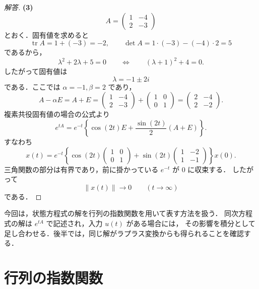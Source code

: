 \documentclass[article,paper=a4paper]{jlreq}
\begin{document}
\begin{proof}[解答]
\medskip
\textbf{(3)}
\[
  A=
  \begin{pmatrix}
    1 & -4\\
    2 & -3
  \end{pmatrix}
\]
とおく．固有値を求めると
\[
  \operatorname{tr}A=1+(-3)=-2,
  \qquad
  \det A=1\cdot(-3)-(-4)\cdot2=5
\]
であるから，
\[
  \lambda^2+2\lambda+5=0
  \qquad\Longleftrightarrow\qquad
  (\lambda+1)^2+4=0.
\]
したがって固有値は
\[
  \lambda=-1\pm2i
\]
である．ここでは $\alpha=-1,\beta=2$ であり，
\[
  A-\alpha E=A+E=
  \begin{pmatrix}
    1 & -4\\
    2 & -3
  \end{pmatrix}
  +
  \begin{pmatrix}
    1 & 0\\
    0 & 1
  \end{pmatrix}
  =
  \begin{pmatrix}
    2 & -4\\
    2 & -2
  \end{pmatrix}.
\]
複素共役固有値の場合の公式より
\[
  e^{tA}
    =
    e^{-t}
    \left\{
      \cos(2t)E+\frac{\sin(2t)}{2}(A+E)
    \right\}.
\]
すなわち
\[
  x(t)
    =
    e^{-t}
    \left\{
      \cos(2t)
      \begin{pmatrix}
        1 & 0\\
        0 & 1
      \end{pmatrix}
      +
      \sin(2t)
      \begin{pmatrix}
        1 & -2\\
        1 & -1
      \end{pmatrix}
    \right\}x(0).
\]
三角関数の部分は有界であり，前に掛かっている $e^{-t}$ が $0$ に収束する．
したがって
\[
  \|x(t)\|\to0
  \qquad (t\to\infty)
\]
である．
\end{proof}

\clearpage


今回は，状態方程式の解を行列の指数関数を用いて表す方法を扱う．
同次方程式の解は $e^{tA}$ で記述され，入力 $u(t)$ がある場合には，
その影響を積分として足し合わせる．後半では，同じ解がラプラス変換からも得られることを確認する．

\section{行列の指数関数}
\end{document}
